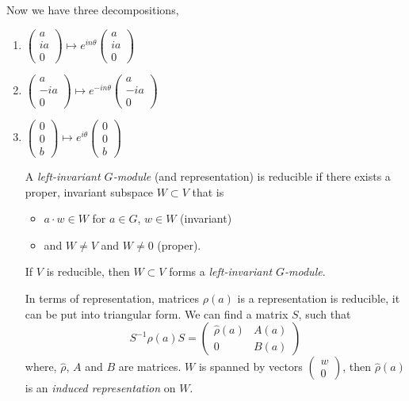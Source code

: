 Now we have three decompositions, 
\begin{enumerate}
    \item $
        \begin{pmatrix}
        a \\ ia \\ 0
    \end{pmatrix} \mapsto e^{in\theta}\begin{pmatrix}
        a \\ ia \\ 0
    \end{pmatrix}
    $
    \item $
        \begin{pmatrix}
        a \\ -ia \\ 0
    \end{pmatrix} \mapsto e^{-in\theta}\begin{pmatrix}
        a \\ -ia \\ 0
    \end{pmatrix}
    $
    \item $
        \begin{pmatrix}
        0 \\ 0 \\ b
    \end{pmatrix} \mapsto e^{i\theta}\begin{pmatrix}
        0 \\ 0 \\ b
    \end{pmatrix}
    $

A \textit{left-invariant $G$-module} (and representation) is reducible if there exists a proper, invariant subspace $W\subset V$ that is
\begin{itemize}
    \item $a\cdot w\in W$ for $a\in G$, $w\in W$ (invariant)
    \item and $W\neq V$ and $W\neq 0$ (proper).
\end{itemize}

If $V$ is reducible, then $W\subset V$ forms a \textit{left-invariant $G$-module}.

In terms of representation, matrices $\rho(a)$ is a representation is reducible, it can be put into triangular form. We can find a matrix $S$, such that 
\begin{equation}
    S^{-1}\rho(a)S = \begin{pmatrix}
        \hat{\rho}(a) & A(a)\\
        0 & B(a)
    \end{pmatrix}
\end{equation}
where, $\hat{\rho}$, $A$ and $B$ are matrices. $W$ is spanned by vectors $\begin{pmatrix}w\\0\end{pmatrix}$, then $\hat{\rho}(a)$ is an \textit{induced representation} on $W$. 


\end{enumerate}
